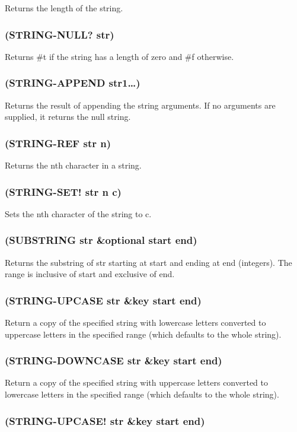 \documentclass[11pt]{article}
\begin{document}
Returns the length of the string.
\subsubsection{(STRING-NULL? str)}
\label{sec-4-28-3}

Returns \#t if the string has a length of zero and \#f otherwise.
\subsubsection{(STRING-APPEND str1\ldots{})}
\label{sec-4-28-4}

Returns the result of appending the string arguments.  If no
arguments are supplied, it returns the null string.
\subsubsection{(STRING-REF str n)}
\label{sec-4-28-5}

Returns the nth character in a string.
\subsubsection{(STRING-SET! str n c)}
\label{sec-4-28-6}

Sets the nth character of the string to c.
\subsubsection{(SUBSTRING str \&optional start end)}
\label{sec-4-28-7}

Returns the substring of str starting at start and ending at end
(integers).  The range is inclusive of start and exclusive of end.
\subsubsection{(STRING-UPCASE str \&key start end)}
\label{sec-4-28-8}

Return a copy of the specified string with lowercase letters
converted to uppercase letters in the specified range (which defaults
to the whole string).
\subsubsection{(STRING-DOWNCASE str \&key start end)}
\label{sec-4-28-9}

Return a copy of the specified string with uppercase letters
converted to lowercase letters in the specified range (which defaults
to the whole string).
\subsubsection{(STRING-UPCASE! str \&key start end)}
\label{sec-4-28-10}
\end{document}

